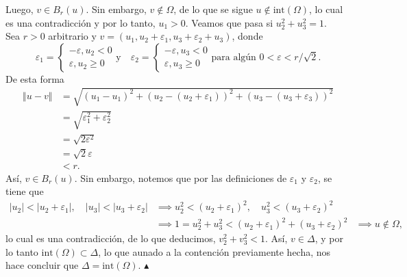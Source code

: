 \documentclass[12pt]{article}
\newcommand{\abs}[1]{\left\vert#1\right\vert}
\newcommand{\norm}[1]{\left\Vert#1\right\Vert}
\begin{document}
\begin{enumerate}
\[\]
Luego, $v \in B_r(u)$. Sin embargo, $v \notin \Omega$, de lo que se sigue $u \notin \text{int}(\Omega)$, lo cual es una contradicción y por lo tanto, $u_1 > 0$. Veamos que pasa si $u_2^2+u_3^2=1$. \\ Sea $r > 0$ arbitrario y
$v=(u_1,u_2+\varepsilon_1,u_3+\varepsilon_2+u_3)$,
donde 
\[
\varepsilon_1=
\begin{cases}
    -\varepsilon, u_2 < 0 \\
    \varepsilon, u_2 \geq 0
\end{cases}  \text{y} \quad 
\varepsilon_2=
\begin{cases}
    -\varepsilon, u_3 < 0 \\
    \varepsilon, u_3 \geq 0
\end{cases} \text{para algún } 0 < \varepsilon < r/\sqrt{2}.
\]
De esta forma
\begin{align*}
    \norm{u-v} &= \sqrt{(u_1-u_1)^2+(u_2-(u_2+\varepsilon_1))^2 + (u_3-(u_3+\varepsilon_3))^2} \\
    &= \sqrt{\varepsilon_1^2 + \varepsilon_2^2} \\
    &= \sqrt{2\varepsilon^2} \\
    &= \sqrt{2}\varepsilon \\
    &< r.
\end{align*}
Así, $v \in B_r(u)$. Sin embargo, notemos que por las definiciones de $\varepsilon_1$ y $\varepsilon_2$, se tiene que
\begin{align*}
    \abs{u_2} < \abs{u_2+\varepsilon_1}, \quad \abs{u_3}<\abs{u_3+\varepsilon_2} &\implies u_2^2 < (u_2+\varepsilon_1)^2, \quad u_3^2 < (u_3+\varepsilon_2)^2 \\
    &\implies 1= u_2^2 + u_3^2 < (u_2+\varepsilon_1)^2 + (u_3+\varepsilon_2)^2
    &\implies u \notin \Omega,
\end{align*}
lo cual es una contradicción, de lo que deducimos, $v_2^2+v_3^2<1$. Así, $v \in \Delta$, y por lo tanto $\text{int}(\Omega)\subset \Delta$, lo que aunado a la contención
previamente hecha, nos hace concluir que $\Delta=\text{int}(\Omega)$. $\blacktriangle$



\end{enumerate}
\end{document}
